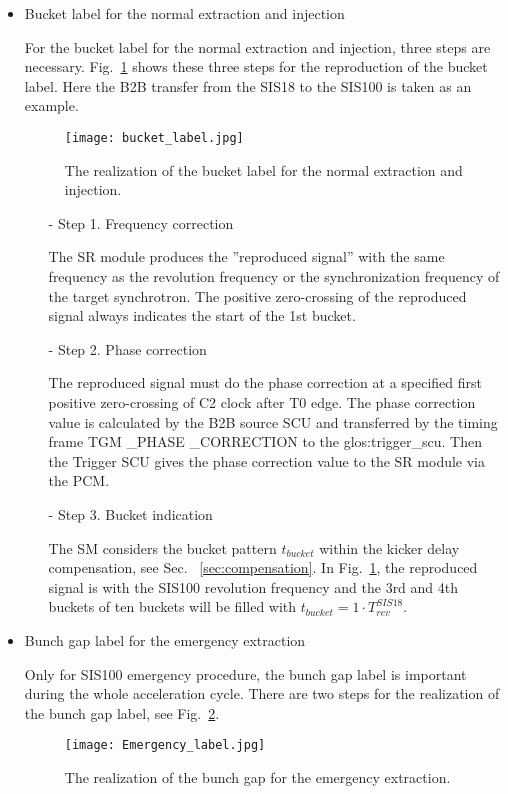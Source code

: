 \begin{itemize}
\item Bucket label for the normal extraction and injection

For the bucket label for the normal extraction and injection, three steps are necessary. Fig.~\ref{bucket_label} shows these three steps for the reproduction of the bucket label. Here the B2B transfer from the SIS18 to the SIS100 is taken as an example.
\begin{figure}[H]
   \centering   
   \texttt{[image: bucket\_label.jpg]}
   \caption{The realization of the bucket label for the normal extraction and injection.}
   \label{bucket_label}
\end{figure}  
\begin{itemize}
\item[-] Step 1. Frequency correction

The \gls{SR} module produces the ''reproduced signal'' with the same frequency as the revolution frequency or the synchronization frequency of the target synchrotron. The positive zero-crossing of the reproduced signal always indicates the start of the 1st bucket.
\item[-] Step 2. Phase correction

The reproduced signal must do the phase correction at a specified first positive zero-crossing of C2 clock after T0 edge. The phase correction value is calculated by the B2B source SCU and transferred by the timing frame TGM \_PHASE \_CORRECTION to the \gls{glos:trigger_scu}. Then the Trigger SCU gives the phase correction value to the SR module via the PCM.

\item[-] Step 3. Bucket indication

The SM considers the bucket pattern $t_{\mathit{bucket}}$ within the kicker delay compensation, see Sec. ~\ref{sec:compensation}. In Fig.~\ref{bucket_label}, the reproduced signal is with the SIS100 revolution frequency and the 3rd and 4th buckets of ten buckets will be filled with $t_{\mathit{bucket}}=1\cdot T_{\mathit{rev}}^{\mathit{SIS18}}$. 
\end{itemize}

\item Bunch gap label for the emergency extraction

Only for SIS100 emergency procedure, the bunch gap label is important during the whole acceleration cycle. There are two steps for the realization of the bunch gap label, see Fig.~\ref{Emergency_label}.
\begin{figure}[!htb]
   \centering   
   \texttt{[image: Emergency\_label.jpg]}
   \caption{The realization of the bunch gap for the emergency extraction.}
   \label{Emergency_label}
\end{figure} 


\end{itemize}
